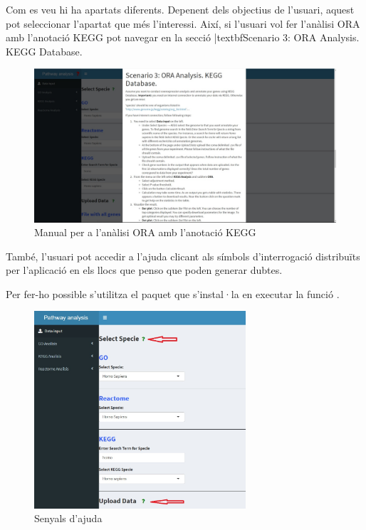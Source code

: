 \documentclass[]{article}
\begin{document}
Com es veu hi ha apartats diferents. Depenent dels objectius de l'usuari, aquest pot seleccionar l'apartat que més l'interessi. Així, si l'usuari vol fer l'anàlisi ORA amb l'anotació KEGG pot navegar en la secció |textbf{Scenario 3: ORA Analysis. KEGG Database}. 

\begin{figure}[H]
\centering
\includegraphics[width=1\textwidth]{Manual2.jpg} 
\caption{Manual per a l'anàlisi ORA amb l'anotació KEGG}
\end{figure}


També, l'usuari pot accedir a l'ajuda clicant als símbols d'interrogació distribuïts per l’aplicació en els llocs que penso que poden generar dubtes. 

Per fer-ho possible s'utilitza el paquet  que s'instal·la en executar la funció .

\begin{figure}[H]
\centering
\includegraphics[width=0.7\textwidth]{Help_Data_Input.jpg} 
\caption{Senyals d'ajuda}
\end{figure}
\end{document}
